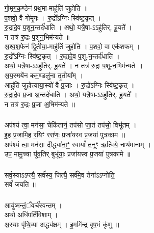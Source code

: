 \subsubsection{}
गो॒मृ॒ग॒क॒ण्ठेन॑ प्रथ॒मा-माहु॑तिं जुहोति ।\\
प॒शवो॒ वै गो॑मृ॒गः । रु॒द्रो᳚ऽग्निः स्वि॑ष्ट॒कृत् ।\\
रु॒द्रादे॒व प॒शून॒न्तर्द॑धाति । अथो॒ यत्रै॒षा-ऽऽहु॑तिर्. हू॒यते᳚ ।\\
न तत्र॑ रु॒द्रः प॒शून॒भिम॑न्यते ॥\\
अ॒श्व॒श॒फेन॑ द्वि॒तीया॒-माहु॑तिं जुहोति । प॒शवो॒ वा एक॑शफम् ।\\
रु॒द्रो᳚ऽग्निः स्वि॑ष्ट॒कृत् । रु॒द्रादे॒व प॒शू-न॒न्तर्द॑धाति ।\\
अथो॒ यत्रै॒षा-ऽऽहु॑तिर्. हू॒यते᳚ । न तत्र॑ रु॒द्रः प॒शू-न॒भिम॑न्यते ॥\\
अ॒य॒स्मये॑न कम॒ण्डलु॑ना तृ॒तीया᳚म् ।\\
आहु॑तिं जुहोत्याया॒स्यो॑ वै प्र॒जाः । रु॒द्रो᳚ऽग्निः स्वि॑ष्ट॒कृत् ।\\
रु॒द्रादे॒व प्र॒जा अ॒न्तर्द॑धाति । अथो॒ यत्रै॒षा-ऽऽहु॑तिर्. हू॒यते᳚ ।\\
न तत्र॑ रु॒द्रः प्र॒जा अ॒भिम॑न्यते ॥\\
\subsubsection{}
अप॑श्यं त्वा॒ मन॑सा॒ चेकि॑तानं॒ तप॑सो जा॒तं तप॑सो॒ विभू॑तम् ।\\
इ॒ह प्र॒जामि॒ह र॒यिꣳ ररा॑णः॒ प्रजा॑यस्व प्र॒जया॑ पुत्रकाम ॥\\
अप॑श्यं त्वा॒ मन॑सा॒ दीद्ध्या॑ना॒ꣲ॒ स्वायां᳚ त॒नूꣳ ऋ॒त्विये॒ नाथ॑मानाम् ।\\
उप॒ मामु॒च्चा यु॑व॒तिर् बुभू॑याः॒ प्रजा॑यस्व प्र॒जया॑ पुत्रकामे ॥\\
\subsubsection{}
सर्व॒स्याऽऽप्त्यै॒ सर्व॑स्य॒ जित्यै॒ सर्व॑मे॒व तेना᳚ऽऽप्नोति॒\\
सर्वं॑ जयति ॥\\
\subsubsection{}
आयु॑ष्मन्तं॒ँवर्च॑स्वन्तम् ।\\
अथो॒ अधि॑पतिंँवि॒शाम् ।\\
अ॒स्याः पृ॑थि॒व्या अद्ध्य॑क्षम् । इ॒ममि॑न्द्र वृष॒भं कृ॑णु ॥\\
